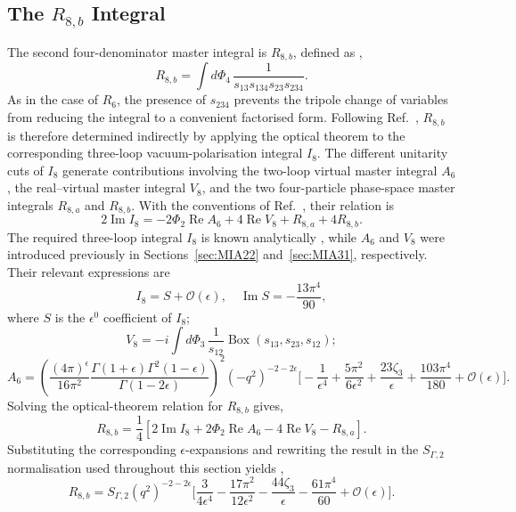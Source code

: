 \subsection{The $R_{8,b}$ Integral}

The second four-denominator master integral is $R_{8,b}$, defined as
\cite{GehrmannDeRidder0311276},
\begin{equation}
    R_{8,b} = \int d\Phi_4\,\frac1{s_{13}s_{134}s_{23}s_{234}}.
\end{equation}
As in the case of $R_6$, the presence of $s_{234}$ prevents the tripole change of variables from
reducing the integral to a convenient factorised form. Following
Ref.~\cite{GehrmannDeRidder0311276}, $R_{8,b}$ is therefore determined indirectly by applying
the optical theorem to the corresponding three-loop vacuum-polarisation integral $I_8$. The
different unitarity cuts of $I_8$ generate contributions involving the two-loop virtual master
integral $A_6$, the real--virtual master integral $V_8$, and the two four-particle phase-space
master integrals $R_{8,a}$ and $R_{8,b}$. With the conventions of
Ref.~\cite{GehrmannDeRidder0311276}, their relation is
\begin{equation}
    2\operatorname{Im}I_8 = -2\Phi_2\operatorname{Re}A_6+4\operatorname{Re}V_8+R_{8,a}+4R_{8,b}.
\end{equation}
The required three-loop integral $I_8$ is known analytically
\cite{GehrmannDeRidder0311276}, while $A_6$ and $V_8$ were introduced previously in
Sections~\ref{sec:MIA22} and~\ref{sec:MIA31}, respectively. Their relevant expressions
are
\begin{equation}
    I_8 = S + \mathcal O(\epsilon),\quad \operatorname{Im}S = -\frac{13\pi^4}{90},
\end{equation}
where $S$ is the $\epsilon^0$ coefficient of $I_8$;
\begin{equation}
    V_8 = -i\int d\Phi_3\,\frac1{s_{12}}\operatorname{Box}(s_{13}, s_{23}, s_{12});
\end{equation}
\begin{equation}
    A_6 = \left(\frac{(4\pi)^\epsilon}{16\pi^2}\frac{\Gamma(1+\epsilon)\Gamma^2(1-\epsilon)}{\Gamma(1-2\epsilon)}\right)^2\!\left(-q^2\right)^{-2-2\epsilon}\Bigg[-\frac1{\epsilon^4}+\frac{5\pi^2}{6\epsilon^2}+\frac{23\zeta_3}\epsilon+\frac{103\pi^4}{180}+\mathcal O(\epsilon)\Bigg].
\end{equation}
Solving the optical-theorem relation for $R_{8,b}$ gives,
\begin{equation}
    R_{8,b}=\frac14\left[2\operatorname{Im}I_8+2\Phi_2\operatorname{Re}A_6-4\operatorname{Re}V_8-R_{8,a}\right].
\end{equation}
Substituting the corresponding $\epsilon$-expansions and rewriting the result in the
$S_{\Gamma,2}$ normalisation used throughout this section yields \cite{GehrmannDeRidder0311276},
\begin{equation}
    R_{8,b} = S_{\Gamma,2}\!\left(q^2\right)^{-2-2\epsilon}\Bigg[\frac3{4\epsilon^4}-\frac{17\pi^2}{12\epsilon^2}-\frac{44\zeta_3}{\epsilon}-\frac{61\pi^4}{60}+\mathcal O(\epsilon)\Bigg].
\end{equation}

